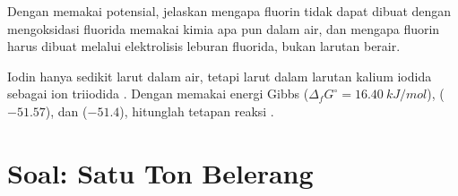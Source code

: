 \begin{exercise}[$\star\star\star$]\label{exo:b1:p-block-16-18:11}
Dengan memakai potensial, jelaskan mengapa fluorin tidak dapat dibuat
dengan mengoksidasi fluorida memakai  kimia apa pun dalam air,
dan mengapa fluorin harus dibuat melalui elektrolisis leburan fluorida,
bukan larutan berair.
\end{exercise}

\begin{exercise}[$\star\star\star$]\label{exo:b1:p-block-16-18:12}
Iodin hanya sedikit larut dalam air, tetapi larut dalam larutan kalium
iodida sebagai ion triiodida . Dengan memakai energi Gibbs
 ($\Delta_f G^\circ = \qty{16.40}{kJ/mol}$),  ($-51.57$),
dan  ($-51.4$), hitunglah tetapan reaksi .
\end{exercise}

\section{Soal: Satu Ton Belerang}

